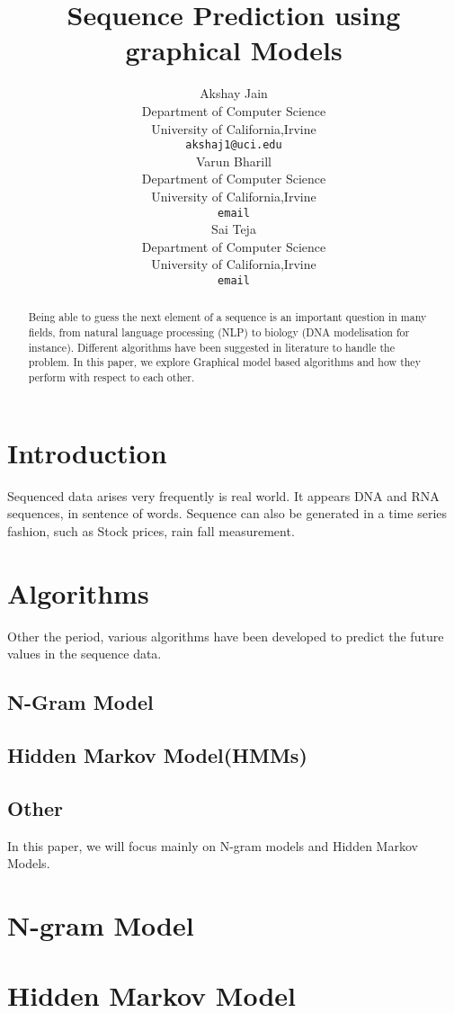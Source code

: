 \documentclass{article} %
\title{Sequence Prediction using graphical Models }
\author{
Akshay Jain\\
Department of Computer Science\\
University of California,Irvine \\
\texttt{akshaj1@uci.edu} \\
\And
Varun Bharill \\
Department of Computer Science\\
University of California,Irvine \\
\texttt{email} \\
\And
Sai Teja \\
Department of Computer Science\\
University of California,Irvine \\
\texttt{email} \\
}
\begin{document}
\maketitle

\begin{abstract}
Being able to guess the next element of a sequence is an important question in many fields, from natural language processing (NLP) to biology (DNA modelisation for instance). Different algorithms have been suggested in literature to handle the problem. In this paper, we explore Graphical model based algorithms and how they perform with respect to each other.
\end{abstract}

\section{Introduction}
\label{Introduction}
Sequenced data arises very frequently is real world. It appears DNA and RNA sequences, in sentence of words. Sequence can also be generated in a time series fashion, such as Stock prices, rain fall measurement. 

\section{Algorithms}
\label{Algorithms}
Other the period, various algorithms have been developed to predict the future values in the sequence data. 
\subsection{N-Gram Model}

\subsection{Hidden Markov Model(HMMs)}

\subsection{Other}

In this paper, we will focus mainly on N-gram models and Hidden Markov Models.

\section{N-gram Model}
\label{N-Gram Model}

\section{Hidden Markov Model}
\label{HMM}
\end{document}
